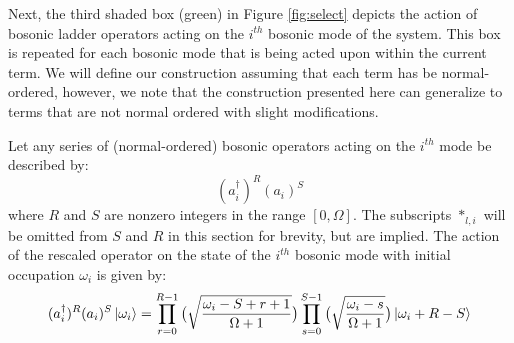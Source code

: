 Next, the third shaded box (green) in Figure \ref{fig:select} depicts the action of bosonic ladder operators acting on the $i^{th}$ bosonic mode of the system.
This box is repeated for each bosonic mode that is being acted upon within the current term.
We will define our construction assuming that each term has be normal-ordered, however, we note that the construction presented here can generalize to terms that are not normal ordered with slight modifications.

Let any series of (normal-ordered) bosonic operators acting on the $i^{th}$ mode be described by:
\begin{equation}
    (a_i^\dagger)^R (a_i)^S
\end{equation}
where $R$ and $S$ are nonzero integers in the range $[0, \Omega]$.
The subscripts $*_{l, i}$ will be omitted from $S$ and $R$ in this section for brevity, but are implied.
The action of the rescaled operator on the state of the $i^{th}$ bosonic mode with initial occupation $\omega_i$ is given by:
\begin{equation}
    \label{eq:bosonic-operator-action}
    (a_i^\dagger)^R (a_i)^S \ket{\omega_i} = \prod_{r=0}^{R-1} \big( \sqrt{\frac{\omega_i - S + r + 1}{\Omega + 1}} \big) \prod_{s=0}^{S-1} \big( \sqrt{\frac{\omega_i - s}{\Omega + 1}} \big) \ket{\omega_i + R - S}
\end{equation}

